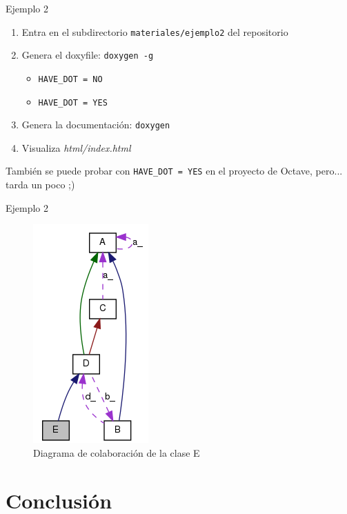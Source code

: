 \documentclass[12pt,xcolor=svgnames]{beamer}
\begin{document}
\begin{frame}{Ejemplo 2}
  \begin{enumerate}
  \item Entra en el subdirectorio \texttt{materiales/ejemplo2} del repositorio
  \item Genera el doxyfile: \texttt{doxygen -g}
    \begin{itemize}
    \item \texttt{HAVE\_DOT = NO}
    \item \texttt{HAVE\_DOT = YES}
    \end{itemize}
  \item Genera la documentación: \texttt{doxygen}
  \item Visualiza \textit{html/index.html}
  \end{enumerate}

  \begin{block}{}
  También se puede probar con \texttt{HAVE\_DOT = YES} en el proyecto de
    Octave, pero... tarda un poco ;)
  \end{block}
\end{frame}

\begin{frame}{Ejemplo 2}
    \begin{figure}
      \centering
      \includegraphics[scale=0.5]{./img/ejemplo2}
      \caption{Diagrama de colaboración de la clase E}
    \end{figure}
\end{frame}


\section{Conclusión}
\end{document}

